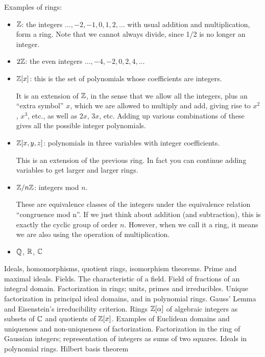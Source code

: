 \begin{example}
Examples of rings:
\begin{itemize}
\item $\mathbb Z$: the integers $\dots,-2,-1,0,1,2,\dots$ with usual addition and multiplication, form a ring. Note that we cannot always divide, since 1/2 is no longer an integer.

\item $2\mathbb Z$: the even integers $\dots,-4,-2,0,2,4,\dots$

\item $\mathbb Z[x]$: this is the set of polynomials whose coefficients are integers. 

It is an extension of $\mathbb Z$, in the sense that we allow all the integers, plus an “extra symbol” $x$, which we are allowed to multiply and add, giving rise to $x^2$, $x^3$, etc., as well as $2x$, $3x$, etc. Adding up various combinations of these gives all the possible integer polynomials.

\item $\mathbb Z[x,y,z]$: polynomials in three variables with integer coefficients. 

This is an extension of the previous ring. In fact you can continue adding variables to get larger and larger rings.

\item $\mathbb Z/n\mathbb Z$: integers mod $n$. 

These are equivalence classes of the integers under the equivalence relation “congruence mod n”. If we just think about addition (and subtraction), this is exactly the cyclic group of order $n$. However, when we call it a ring, it means we are also using the operation of multiplication.

\item $\mathbb Q$, $\mathbb R$, $\mathbb C$
\end{itemize}
\end{example}

Ideals, homomorphisms, quotient rings, isomorphism theorems. Prime and maximal ideals. Fields. The characteristic of a field. Field of fractions of an
integral domain.
Factorization in rings; units, primes and irreducibles. Unique factorization in principal ideal domains, and
in polynomial rings. Gauss’ Lemma and Eisenstein’s irreducibility criterion.
Rings $\mathbb Z[\alpha]$ of algebraic integers as subsets of $\mathbb C$ and quotients of $\mathbb Z[x]$. Examples of Euclidean domains and
uniqueness and non-uniqueness of factorization. Factorization in the ring of Gaussian integers; representation of integers as sums of two squares.
Ideals in polynomial rings. Hilbert basis theorem

